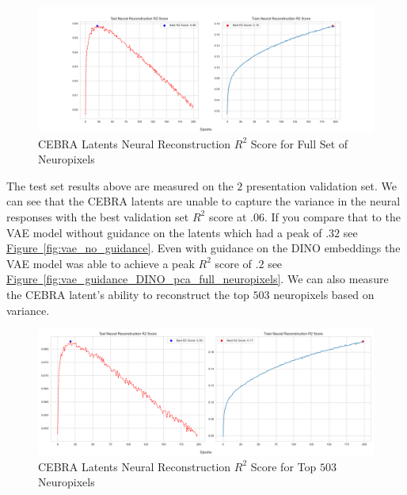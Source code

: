 \documentclass[12pt, letterpaper]{article}
\begin{document}
\begin{figure}[H]
    \centering
    \includegraphics[width=1.0\textwidth]{cebra_x_r2_772_200_epochs_3_layer.png}
    \caption{CEBRA Latents Neural Reconstruction $R^2$ Score for Full Set of Neuropixels}
    \label{fig:cebra_latents_neural_reconstruction_772}
\end{figure}

The test set results above are measured on the $2$ presentation validation set. We can see that the CEBRA \cite{schneider2023} latents are unable to capture the variance in the neural responses with the best validation set $R^2$ score at $.06$. If you compare that to the VAE model without guidance on the latents which had a peak of $.32$ see \hyperref[fig:vae_no_guidance]{Figure~\ref{fig:vae_no_guidance}}. Even with guidance on the DINO \cite{dino} embeddings the VAE model was able to achieve a peak $R^2$ score of $.2$ see \hyperref[fig:vae_guidance_DINO_pca_full_neuropixels]{Figure~\ref{fig:vae_guidance_DINO_pca_full_neuropixels}}. We can also measure the CEBRA \cite{schneider2023} latent's ability to reconstruct the top $503$ neuropixels based on variance.

\begin{figure}[H]
    \centering
    \includegraphics[width=1.0\textwidth]{cebra_x_r2_503_200_epochs_3_layer.png}
    \caption{CEBRA Latents Neural Reconstruction $R^2$ Score for Top $503$ Neuropixels}
    \label{fig:cebra_latents_neural_reconstruction_503}
\end{figure}
\end{document}
